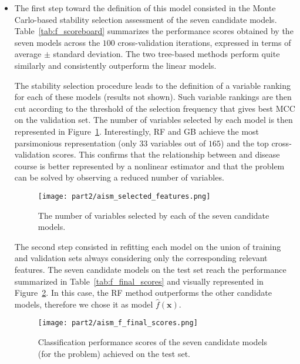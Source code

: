 \begin{itemize}
	\item[] \textbf{\F}
	The first step toward the definition of this model consisted in the Monte Carlo-based stability selection assessment of the seven candidate models. Table~\ref{tab:f_scoreboard} summarizes the performance scores obtained by the seven models across the $100$ cross-validation iterations, expressed in terms of average $\pm$ standard deviation. The two tree-based methods perform quite similarly and consistently outperform the linear models.
	
	
	
	The stability selection procedure leads to the definition of a variable ranking for each of these models (results not shown). Such variable rankings are then cut according to the threshold of the selection frequency that gives best MCC on the validation set. The number of variables selected by each model is then represented in Figure~\ref{fig:n_selected}. Interestingly, RF and GB achieve the most parsimonious representation (only $33$ variables out of $165$) and the top cross-validation scores. This confirms that the relationship between \PCOs and disease course is better represented by a nonlinear estimator and that the \F problem can be solved by observing a reduced number of \PCO variables.
	
	\begin{figure}[]
		\centering
		\texttt{[image: part2/aism\_selected\_features.png]}
		\caption{The number of variables selected by each of the seven candidate models.} \label{fig:n_selected}
	\end{figure}

	The second step consisted in refitting each model on the union of training and validation sets always considering only the corresponding relevant features.
	The seven candidate models on the test set reach the performance summarized in Table~\ref{tab:f_final_scores} and visually represented in Figure~\ref{fig:f_final_scores}.
	In this case, the RF method outperforms the other candidate models, therefore we chose it as \F model $\hat{f}(\bm{x})$.

	
	
	\begin{figure}[]
		\centering
		\texttt{[image: part2/aism\_f\_final\_scores.png]}
		\caption{Classification performance scores of the seven candidate models (for the \F problem) achieved on the test set.} \label{fig:f_final_scores}
	\end{figure}


\end{itemize}
